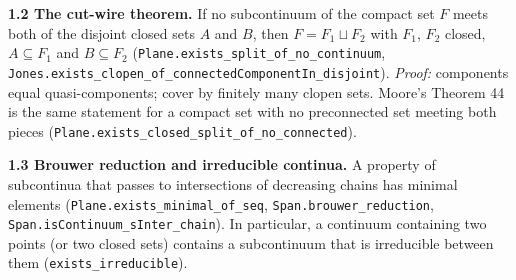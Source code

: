\documentclass[11pt]{article}
\newcommand{\lean}[1]{\texttt{#1}}
\begin{document}
\textbf{1.2 The cut-wire theorem.} If no subcontinuum of the compact set $F$ meets both of the disjoint closed sets $A$ and $B$, then $F = F_1 \sqcup F_2$ with $F_1$, $F_2$ closed, $A \subseteq F_1$ and $B \subseteq F_2$ (\lean{Plane.\hspace{0pt}exists\_\hspace{0pt}split\_\hspace{0pt}of\_\hspace{0pt}no\_\hspace{0pt}continuum}, \lean{Jones.\hspace{0pt}exists\_\hspace{0pt}clopen\_\hspace{0pt}of\_\hspace{0pt}connectedComponentIn\_\hspace{0pt}disjoint}). \emph{Proof:} components equal quasi-components; cover by finitely many clopen sets. Moore's Theorem 44 is the same statement for a compact set with no preconnected set meeting both pieces (\lean{Plane.\hspace{0pt}exists\_\hspace{0pt}closed\_\hspace{0pt}split\_\hspace{0pt}of\_\hspace{0pt}no\_\hspace{0pt}connected}).

\textbf{1.3 Brouwer reduction and irreducible continua.} A property of subcontinua that passes to intersections of decreasing chains has minimal elements (\lean{Plane.\hspace{0pt}exists\_\hspace{0pt}minimal\_\hspace{0pt}of\_\hspace{0pt}seq}, \lean{Span.\hspace{0pt}brouwer\_\hspace{0pt}reduction}, \lean{Span.\hspace{0pt}isContinuum\_\hspace{0pt}sInter\_\hspace{0pt}chain}). In particular, a continuum containing two points (or two closed sets) contains a subcontinuum that is irreducible between them (\lean{exists\_\hspace{0pt}irreducible}).
\end{document}
